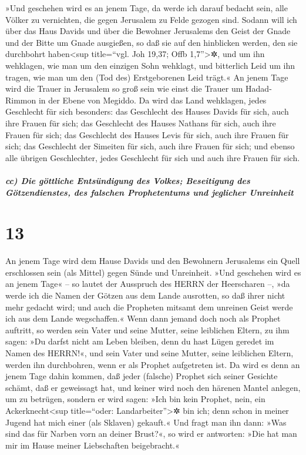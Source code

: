  »Und geschehen wird es an jenem Tage, da werde ich darauf
bedacht sein, alle Völker zu vernichten, die gegen Jerusalem zu Felde
gezogen sind.  Sodann will ich über das Haus Davids und
über die Bewohner Jerusalems den Geist der Gnade und der Bitte um Gnade
ausgießen, so daß sie auf den hinblicken werden, den sie durchbohrt
haben\textless sup title=``vgl. Joh 19,37; Offb 1,7''\textgreater✲, und
um ihn wehklagen, wie man um den einzigen Sohn wehklagt, und bitterlich
Leid um ihn tragen, wie man um den (Tod des) Erstgeborenen Leid trägt.«
 An jenem Tage wird die Trauer in Jerusalem so groß sein
wie einst die Trauer um Hadad-Rimmon in der Ebene von Megiddo.
 Da wird das Land wehklagen, jedes Geschlecht für sich
besonders: das Geschlecht des Hauses Davids für sich, auch ihre Frauen
für sich; das Geschlecht des Hauses Nathans für sich, auch ihre Frauen
für sich;  das Geschlecht des Hauses Levis für sich, auch
ihre Frauen für sich; das Geschlecht der Simeiten für sich, auch ihre
Frauen für sich;  und ebenso alle übrigen Geschlechter,
jedes Geschlecht für sich und auch ihre Frauen für sich.

\hypertarget{cc-die-guxf6ttliche-entsuxfcndigung-des-volkes-beseitigung-des-guxf6tzendienstes-des-falschen-prophetentums-und-jeglicher-unreinheit}{%
\subparagraph{cc) Die göttliche Entsündigung des Volkes; Beseitigung des
Götzendienstes, des falschen Prophetentums und jeglicher
Unreinheit}\label{cc-die-guxf6ttliche-entsuxfcndigung-des-volkes-beseitigung-des-guxf6tzendienstes-des-falschen-prophetentums-und-jeglicher-unreinheit}}

\hypertarget{section-12}{%
\section{13}\label{section-12}}

 An jenem Tage wird dem Hause Davids und den Bewohnern
Jerusalems ein Quell erschlossen sein (als Mittel) gegen Sünde und
Unreinheit.  »Und geschehen wird es an jenem Tage« -- so
lautet der Ausspruch des HERRN der Heerscharen --, »da werde ich die
Namen der Götzen aus dem Lande ausrotten, so daß ihrer nicht mehr
gedacht wird; und auch die Propheten mitsamt dem unreinen Geist werde
ich aus dem Lande wegschaffen.«  Wenn dann jemand doch
noch als Prophet auftritt, so werden sein Vater und seine Mutter, seine
leiblichen Eltern, zu ihm sagen: »Du darfst nicht am Leben bleiben, denn
du hast Lügen geredet im Namen des HERRN!«, und sein Vater und seine
Mutter, seine leiblichen Eltern, werden ihn durchbohren, wenn er als
Prophet aufgetreten ist.  Da wird es denn an jenem Tage
dahin kommen, daß jeder (falsche) Prophet sich seiner Gesichte schämt,
daß er geweissagt hat, und keiner wird noch den härenen Mantel anlegen,
um zu betrügen,  sondern er wird sagen: »Ich bin kein
Prophet, nein, ein Ackerknecht\textless sup title=``oder:
Landarbeiter''\textgreater✲ bin ich; denn schon in meiner Jugend hat
mich einer (als Sklaven) gekauft.«  Und fragt man ihn
dann: »Was sind das für Narben vorn an deiner Brust?«, so wird er
antworten: »Die hat man mir im Hause meiner Liebschaften beigebracht.«

